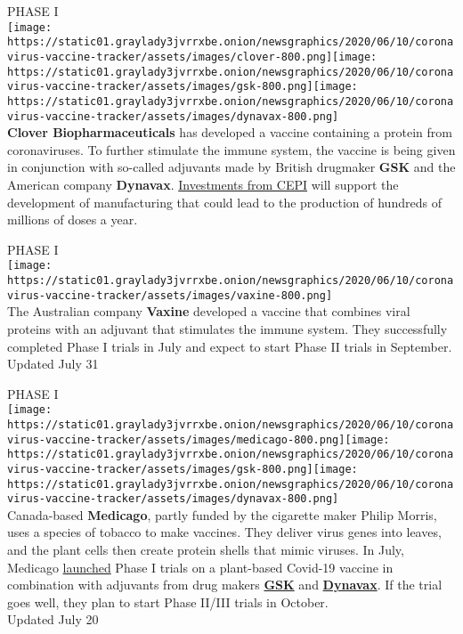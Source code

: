 PHASE I\\
\texttt{[image: https://static01.graylady3jvrrxbe.onion/newsgraphics/2020/06/10/coronavirus-vaccine-tracker/assets/images/clover-800.png]}\texttt{[image: https://static01.graylady3jvrrxbe.onion/newsgraphics/2020/06/10/coronavirus-vaccine-tracker/assets/images/gsk-800.png]}\texttt{[image: https://static01.graylady3jvrrxbe.onion/newsgraphics/2020/06/10/coronavirus-vaccine-tracker/assets/images/dynavax-800.png]}\\
\textbf{Clover Biopharmaceuticals} has developed a vaccine containing a
protein from coronaviruses. To further stimulate the immune system, the
vaccine is being given in conjunction with so-called adjuvants made by
British drugmaker \textbf{GSK} and the American company
\textbf{Dynavax}.
\href{https://cepi.net/news_cepi/cepi-expands-partnership-with-clover-biopharmaceuticals-to-rapidly-advance-development-and-manufacture-of-covid-19-vaccine-candidate/}{Investments
from CEPI} will support the development of manufacturing that could lead
to the production of hundreds of millions of doses a year.

PHASE I\\
\texttt{[image: https://static01.graylady3jvrrxbe.onion/newsgraphics/2020/06/10/coronavirus-vaccine-tracker/assets/images/vaxine-800.png]}\\
The Australian company \textbf{Vaxine} developed a vaccine that combines
viral proteins with an adjuvant that stimulates the immune system. They
successfully completed Phase I trials in July and expect to start Phase
II trials in September.\\
Updated July 31

PHASE I\\
\texttt{[image: https://static01.graylady3jvrrxbe.onion/newsgraphics/2020/06/10/coronavirus-vaccine-tracker/assets/images/medicago-800.png]}\texttt{[image: https://static01.graylady3jvrrxbe.onion/newsgraphics/2020/06/10/coronavirus-vaccine-tracker/assets/images/gsk-800.png]}\texttt{[image: https://static01.graylady3jvrrxbe.onion/newsgraphics/2020/06/10/coronavirus-vaccine-tracker/assets/images/dynavax-800.png]}\\
Canada-based \textbf{Medicago}, partly funded by the cigarette maker
Philip Morris, uses a species of tobacco to make vaccines. They deliver
virus genes into leaves, and the plant cells then create protein shells
that mimic viruses. In July, Medicago
\href{https://www.medicago.com/en/newsroom/medicago-begins-phase-i-clinical-trials-for-its-covid-19-vaccine-candidate/}{launched}
Phase I trials on a plant-based Covid-19 vaccine in combination with
adjuvants from drug makers
\textbf{\href{https://www.medicago.com/en/newsroom/gsk-and-medicago-announce-collaboration-to-develop-a-novel-adjuvanted-covid-19-candidate-vaccine/}{GSK}}
and
\textbf{\href{https://www.medicago.com/en/newsroom/dynavax-and-medicago-announce-collaboration-to-develop-a-novel-adjuvanted-covid-19-vaccine-candidate/}{Dynavax}}.
If the trial goes well, they plan to start Phase II/III trials in
October.\\
Updated July 20

